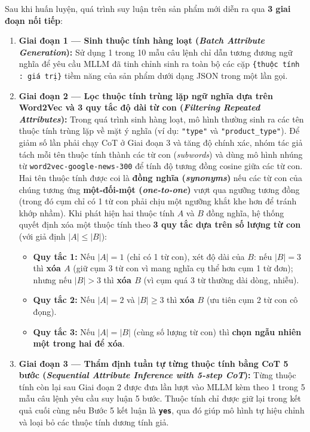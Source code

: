 \documentclass[conference,10pt]{IEEEtran}
\begin{document}
Sau khi huấn luyện, quá trình suy luận trên sản phẩm mới diễn ra qua \textbf{3 giai đoạn nối tiếp}:
\begin{enumerate}
    \item \textbf{Giai đoạn 1 --- Sinh thuộc tính hàng loạt (\textit{Batch Attribute Generation}):} Sử dụng 1 trong 10 mẫu câu lệnh chỉ dẫn tương đương ngữ nghĩa để yêu cầu MLLM đã tinh chỉnh sinh ra toàn bộ các cặp \texttt{\{thuộc tính : giá trị\}} tiềm năng của sản phẩm dưới dạng JSON trong một lần gọi.
    \item \textbf{Giai đoạn 2 --- Lọc thuộc tính trùng lặp ngữ nghĩa dựa trên Word2Vec và 3 quy tắc độ dài từ con (\textit{Filtering Repeated Attributes}):}
    Trong quá trình sinh hàng loạt, mô hình thường sinh ra các tên thuộc tính trùng lặp về mặt ý nghĩa (ví dụ: \texttt{"type"} và \texttt{"product\_type"}). Để giảm số lần phải chạy CoT ở Giai đoạn 3 và tăng độ chính xác, nhóm tác giả tách mỗi tên thuộc tính thành các từ con (\textit{subwords}) và dùng mô hình nhúng từ \texttt{word2vec-google-news-300} để tính độ tương đồng cosine giữa các từ con. Hai tên thuộc tính được coi là \textbf{đồng nghĩa (\textit{synonyms})} nếu các từ con của chúng tương ứng \textbf{một-đối-một (\textit{one-to-one})} vượt qua ngưỡng tương đồng (trong đó cụm chỉ có 1 từ con phải chịu một ngưỡng khắt khe hơn để tránh khớp nhầm). Khi phát hiện hai thuộc tính $A$ và $B$ đồng nghĩa, hệ thống quyết định xóa một thuộc tính theo \textbf{3 quy tắc dựa trên số lượng từ con} (với giả định $|A| \le |B|$):
    \begin{itemize}
        \item \textbf{Quy tắc 1:} Nếu $|A| = 1$ (chỉ có 1 từ con), xét độ dài của $B$: nếu $|B| = 3$ thì \textbf{xóa $A$} (giữ cụm 3 từ con vì mang nghĩa cụ thể hơn cụm 1 từ đơn); nhưng nếu $|B| > 3$ thì \textbf{xóa $B$} (vì cụm quá 3 từ thường dài dòng, nhiễu).
        \item \textbf{Quy tắc 2:} Nếu $|A| = 2$ và $|B| \ge 3$ thì \textbf{xóa $B$} (ưu tiên cụm 2 từ con cô đọng).
        \item \textbf{Quy tắc 3:} Nếu $|A| = |B|$ (cùng số lượng từ con) thì \textbf{chọn ngẫu nhiên một trong hai để xóa}.
    \end{itemize}
    \item \textbf{Giai đoạn 3 --- Thẩm định tuần tự từng thuộc tính bằng CoT 5 bước (\textit{Sequential Attribute Inference with 5-step CoT}):}
    Từng thuộc tính còn lại sau Giai đoạn 2 được đưa lần lượt vào MLLM kèm theo 1 trong 5 mẫu câu lệnh yêu cầu suy luận 5 bước. Thuộc tính chỉ được giữ lại trong kết quả cuối cùng nếu Bước 5 kết luận là \textbf{\texttt{yes}}, qua đó giúp mô hình tự hiệu chỉnh và loại bỏ các thuộc tính dương tính giả.
\end{enumerate}
\end{document}
